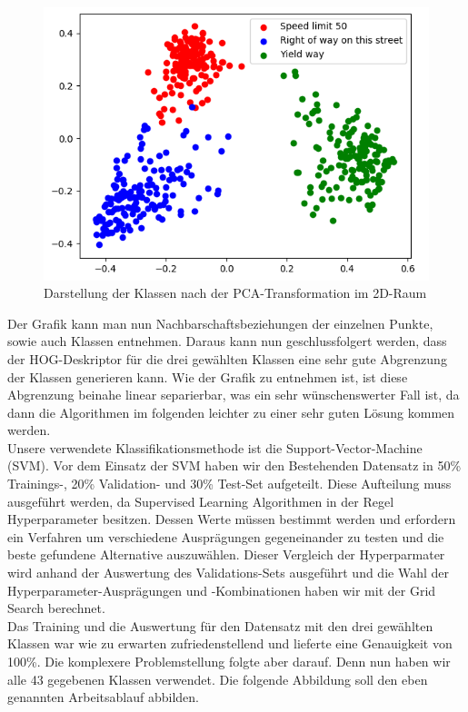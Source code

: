 \begin{figure}[h]
\centering
\includegraphics[scale=0.7]{./bilder/3_classes_pca.png}
\caption{Darstellung der Klassen nach der PCA-Transformation im 2D-Raum}
\end{figure}

Der Grafik kann man nun Nachbarschaftsbeziehungen der einzelnen Punkte, sowie auch Klassen entnehmen.
Daraus kann nun geschlussfolgert werden, dass der HOG-Deskriptor für die drei gewählten Klassen eine sehr gute Abgrenzung der Klassen generieren kann. Wie der Grafik zu entnehmen ist, ist diese Abgrenzung beinahe linear separierbar, was ein sehr wünschenswerter Fall ist, da dann die Algorithmen im folgenden leichter zu einer sehr guten Lösung kommen werden.\\

Unsere verwendete Klassifikationsmethode ist die Support-Vector-Machine (SVM). 
Vor dem Einsatz der SVM haben wir den Bestehenden Datensatz in 50\% Trainings-, 20\% Validation- und 30\% Test-Set aufgeteilt. Diese Aufteilung muss ausgeführt werden, da Supervised Learning Algorithmen in der Regel Hyperparameter besitzen. Dessen Werte müssen bestimmt werden und erfordern ein Verfahren um verschiedene Ausprägungen gegeneinander zu testen und die beste gefundene Alternative auszuwählen. Dieser Vergleich der Hyperparmater wird anhand der Auswertung des Validations-Sets ausgeführt und die Wahl der Hyperparameter-Ausprägungen und -Kombinationen haben wir mit der Grid Search berechnet.\\
Das Training und die Auswertung für den Datensatz mit den drei gewählten Klassen war wie zu erwarten zufriedenstellend und lieferte eine Genauigkeit von 100\%.
Die komplexere Problemstellung folgte aber darauf. Denn nun haben wir alle 43 gegebenen Klassen verwendet. Die folgende Abbildung soll den eben genannten Arbeitsablauf abbilden.\\

